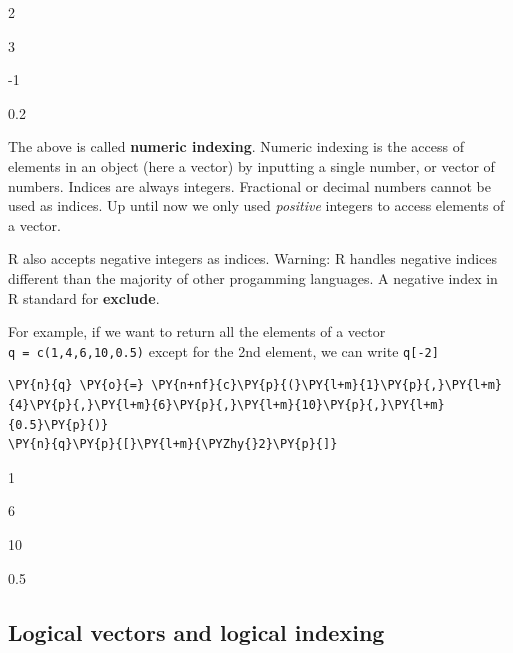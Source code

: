     \begin{enumerate*}
\item 2
\item 3
\item -1
\item 0.2
\end{enumerate*}


    
    The above is called \textbf{numeric indexing}. Numeric indexing is the
access of elements in an object (here a vector) by inputting a single
number, or vector of numbers. Indices are always integers. Fractional or
decimal numbers cannot be used as indices. Up until now we only used
\emph{positive} integers to access elements of a vector.

R also accepts negative integers as indices. Warning: R handles negative
indices different than the majority of other progamming languages. A
negative index in R standard for \textbf{exclude}.

For example, if we want to return all the elements of a vector
\texttt{q\ =\ c(1,4,6,10,0.5)} except for the 2nd element, we can write
\texttt{q{[}-2{]}}

    \begin{tcolorbox}[breakable, size=fbox, boxrule=1pt, pad at break*=1mm,colback=cellbackground, colframe=cellborder]
\begin{Verbatim}[commandchars=\\\{\}]
\PY{n}{q} \PY{o}{=} \PY{n+nf}{c}\PY{p}{(}\PY{l+m}{1}\PY{p}{,}\PY{l+m}{4}\PY{p}{,}\PY{l+m}{6}\PY{p}{,}\PY{l+m}{10}\PY{p}{,}\PY{l+m}{0.5}\PY{p}{)}
\PY{n}{q}\PY{p}{[}\PY{l+m}{\PYZhy{}2}\PY{p}{]}
\end{Verbatim}
\end{tcolorbox}

    \begin{enumerate*}
\item 1
\item 6
\item 10
\item 0.5
\end{enumerate*}


    
    \hypertarget{logical-vectors-and-logical-indexing}{%
\subsection{Logical vectors and logical
indexing}\label{logical-vectors-and-logical-indexing}}

